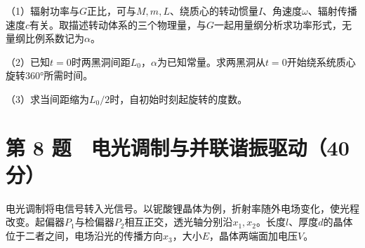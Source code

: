 \documentclass[12pt,a4paper,fontset=fandol]{ctexart}
\begin{document}
\begin{center}
\begin{minipage}{\linewidth}
\centering\begingroup{}
\ifdim\wd\diagrambox>.88\linewidth
\sbox{\diagrambox}{\resizebox{.88\linewidth}{!}{\usebox{\diagrambox}}}\fi
\ifdim\ht\diagrambox>.20\textheight
\resizebox{!}{.20\textheight}{\usebox{\diagrambox}}
\else\usebox{\diagrambox}\fi
\par{}\endgroup\end{minipage}\end{center}

（1）辐射功率与\(G\)正比，可与\(M,m,L\)、绕质心的转动惯量\(I\)、角速度\(\omega\)、辐射传播速度\(c\)有关。取描述转动体系的三个物理量，与\(G\)一起用量纲分析求功率形式，无量纲比例系数记为\(\alpha\)。

（2）已知\(t=0\)时两黑洞间距\(L_0\)，\(\alpha\)为已知常量。求两黑洞从\(t=0\)开始绕系统质心旋转360°所需时间。

（3）求当间距缩为\(L_0/2\)时，自初始时刻起旋转的度数。

\clearpage

\section{第 8
题　电光调制与并联谐振驱动（40分）}\label{ux7b2c-8-ux9898-ux7535ux5149ux8c03ux5236ux4e0eux5e76ux8054ux8c10ux632fux9a71ux52a840ux5206}

电光调制将电信号转入光信号。以铌酸锂晶体为例，折射率随外电场变化，使光程改变。起偏器\(P_1\)与检偏器\(P_2\)相互正交，透光轴分别沿\(x_1,x_2\)。长度\(l\)、厚度\(d\)的晶体位于二者之间，电场沿光的传播方向\(x_3\)，大小\(E\)，晶体两端面加电压\(V\)。
\end{document}
